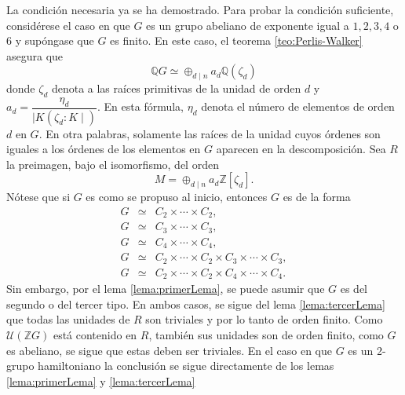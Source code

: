 \begin{proof*}
La condición necesaria ya se ha demostrado. Para probar la condición suficiente, considérese el caso en que $G$ es un grupo abeliano de exponente igual a $1,2,3,4$ o $6$ y supóngase que $G$ es finito. En este caso, el teorema \ref{teo:Perlis-Walker} asegura que \[ \mathds{Q}G \simeq \oplus_{d \mid n}a_d\mathds{Q}(\zeta_d)  \] donde $\zeta_d$ denota a las raíces primitivas de la unidad de orden $d$ y $a_d = \dfrac{\eta_d}{\mid K(\zeta_d : K \mid)}$. En esta fórmula, $\eta_d$ denota el número de elementos de orden $d$ en $G$. En otra palabras, solamente las raíces de la unidad cuyos órdenes son iguales a los órdenes de los elementos en $G$ aparecen en la descomposición.
Sea $R$ la preimagen, bajo el isomorfismo, del orden \[ M = \oplus_{d \mid n}a_d \mathds{Z}[\zeta_d].\] Nótese que si $G$ es como se propuso al inicio, entonces $G$ es de la forma 
\begin{eqnarray*}
G &\simeq& C_2 \times \cdots \times C_2, \\
G &\simeq& C_3 \times \cdots \times C_3, \\
G &\simeq& C_4 \times \cdots \times C_4,  \\
G &\simeq& C_2 \times \cdots \times C_2 \times C_3 \times \cdots \times C_3, \\
G &\simeq& C_2 \times \cdots \times C_2 \times C_4 \times \cdots \times C_4.
\end{eqnarray*}
Sin embargo, por el lema \ref{lema:primerLema}, se puede asumir que $G$ es del segundo o del tercer tipo. En ambos casos, se sigue del lema \ref{lema:tercerLema} que todas las unidades de $R$ son triviales y por lo tanto de orden finito. 
Como $\mathcal{U}(\mathds{Z}G)$ está contenido en $R$, también sus unidades son de orden finito, como $G$ es abeliano, se sigue que estas deben ser triviales.
En el caso en que $G$ es un 2-grupo hamiltoniano la conclusión se sigue directamente de los lemas \ref{lema:primerLema} y \ref{lema:tercerLema}
\end{proof*}
